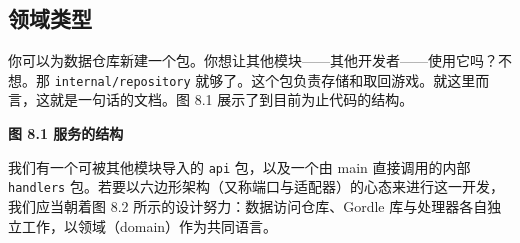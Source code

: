 \subsection{领域类型}

你可以为数据仓库新建一个包。你想让其他模块——其他开发者——使用它吗？不想。那 \texttt{internal/repository} 就够了。这个包负责存储和取回游戏。就这里而言，这就是一句话的文档。图 8.1 展示了到目前为止代码的结构。

\begin{center}

\medskip
\noindent\textbf{图 8.1 服务的结构}
\end{center}

我们有一个可被其他模块导入的 \texttt{api} 包，以及一个由 main 直接调用的内部 \texttt{handlers} 包。若要以六边形架构（又称端口与适配器）的心态来进行这一开发，我们应当朝着图 8.2 所示的设计努力：数据访问仓库、Gordle 库与处理器各自独立工作，以领域（domain）作为共同语言。

